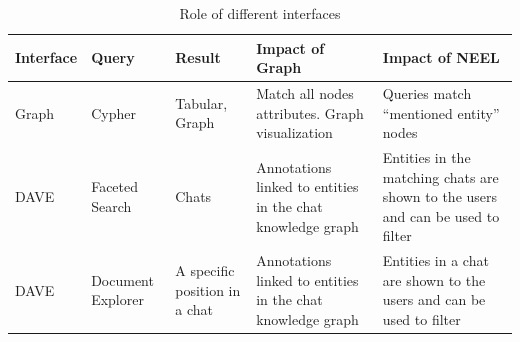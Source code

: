 \begin{table}[h]
\centering
\caption{Role of different interfaces}
\tymin=50pt
\tymax=200pt
\begin{tabulary}{\textwidth}{|L|L|J|J|J|}
\hline
\textbf{Interface} &
  \textbf{Query} &
  \textbf{Result} &
  \textbf{Impact of Graph} &
  \textbf{Impact of NEEL} \\
  \hline
Graph &
  Cypher
  &
  Tabular, Graph &
  Match all nodes attributes. Graph visualization &
  Queries match ``mentioned entity'' nodes \\
  \hline
DAVE &
  Faceted Search &
  Chats &
  Annotations linked to entities in the chat knowledge graph &
  Entities in the matching chats are shown to the users and can be used to filter \\
  \hline
DAVE &
  Document Explorer &
  A specific position in a chat &
  Annotations linked to entities in the chat knowledge graph &
  Entities in a chat are shown to the users and can be used to filter\\
  \hline
\end{tabulary}
\label{tab:interfaces role}
\end{table}

